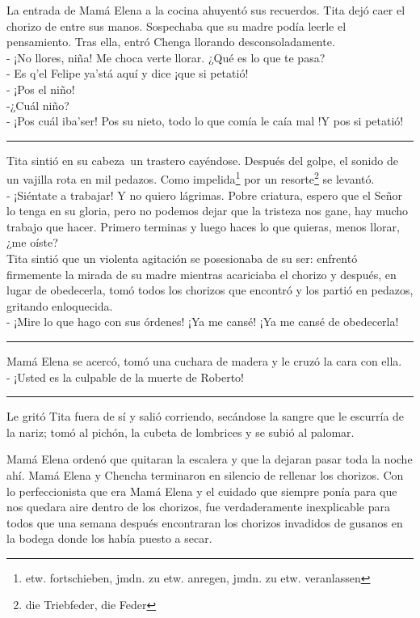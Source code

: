 La entrada de Mamá Elena a la cocina ahuyentó sus recuerdos. Tita dejó
caer el chorizo de entre sus manos. Sospechaba que su madre podía leerle
el pensamiento. Tras ella, entró Chenga llorando desconsoladamente.
\\- ¡No llores, niña! Me choca verte llorar. ¿Qué es lo que te pasa? %
\\- Es q’el Felipe ya’stá aquí y dice ¡que si petatió! %
\\- ¡Pos el niño! %
\\-¿Cuál niño? %
\\- ¡Pos cuál iba’ser! Pos su nieto, todo lo que comía le caía mal !Y pos %
si petatió! \\
\rule{1em}{0pt}Tita sintió en su cabeza~un trastero cayéndose. Después del
golpe, el sonido de un vajilla rota
en mil pedazos. Como impelida\footnote{etw. fortschieben, jmdn. zu etw. anregen, jmdn. zu etw. veranlassen}
por un resorte\footnote{die Triebfeder, die Feder} se
levantó.
\\- ¡Siéntate a trabajar! Y no quiero lágrimas. Pobre criatura, espero que %
el Señor lo tenga en su gloria, pero no podemos dejar que la tristeza %
nos gane, hay mucho trabajo que hacer. Primero terminas y luego haces lo %
que quieras, menos llorar, ¿me oíste?\\

Tita sintió que un violenta agitación se posesionaba de su ser:
enfrentó firmemente la mirada de su madre mientras acariciaba el chorizo
y después, en lugar de obedecerla, tomó todos los chorizos que encontró
y los partió en pedazos, gritando enloquecida.
\\- ¡Mire lo que hago con sus órdenes! ¡Ya me cansé! ¡Ya me cansé de %
obedecerla! \\
\rule{1em}{0pt}Mamá Elena se acercó, tomó una cuchara de madera y le cruzó la cara con
ella.
\\- ¡Usted es la culpable de la muerte de Roberto! \\
\rule{1em}{0pt}Le gritó Tita fuera de sí y salió corriendo, secándose la sangre que
le escurría de la nariz; tomó al pichón, la cubeta de lombrices y se
subió al palomar.

Mamá Elena ordenó que quitaran la escalera y que la dejaran pasar toda
la noche ahí. Mamá Elena y Chencha terminaron en silencio de rellenar
los chorizos. Con lo perfeccionista que era Mamá Elena y el cuidado que
siempre ponía para que nos quedara aire dentro de los chorizos, fue
verdaderamente inexplicable para todos que una semana después
encontraran los chorizos invadidos de gusanos en la bodega donde los
había puesto a secar.

